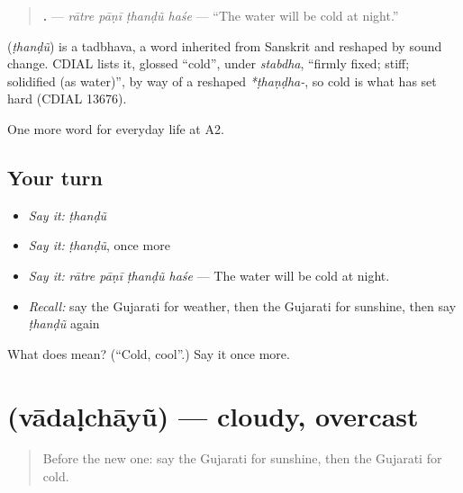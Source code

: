 \begin{quote}
\textbf{   .} — \emph{rātre pāṇī ṭhanḍũ haśe} — \textquotedblleft{}The water will be cold at night.\textquotedblright{}
\end{quote}

\begin{cousinweb}
\textbf{} (\emph{ṭhanḍũ}) is a tadbhava, a word inherited from Sanskrit and reshaped by sound change. CDIAL lists it, glossed \textquotedblleft{}cold\textquotedblright{}, under \emph{stabdha}, \textquotedblleft{}firmly fixed; stiff; solidified (as water)\textquotedblright{}, by way of a reshaped \emph{*ṭhaṇḍha-}, so cold is what has set hard (CDIAL 13676).
\end{cousinweb}

\begin{grammarlens}[title={What you've built}]
One more word for everyday life at A2.
\end{grammarlens}

\subsection*{Your turn}
\begin{itemize}
\raggedright
  \item \emph{Say it:} \emph{ṭhanḍũ}
  \item \emph{Say it:} \emph{ṭhanḍũ}, once more
  \item \emph{Say it:} \emph{rātre pāṇī ṭhanḍũ haśe} — The water will be cold at night.
  \item \emph{Recall:} say the Gujarati for weather, then the Gujarati for sunshine, then say \emph{ṭhanḍũ} again
\end{itemize}

\begin{tcolorbox}[breakable,colback=teal!4,colframe=teal!35!black,title={Before you move on}]
What does  mean? (\textquotedblleft{}Cold, cool\textquotedblright{}.) Say it once more.
\end{tcolorbox}
\section[\texorpdfstring{\gu{વાદળછાયું} (vādaḷchāyũ)}{વાદળછાયું (vādaḷchāyũ)}]{ (vādaḷchāyũ) — cloudy, overcast}

\label{lesson:GU-C213-vadalchayu}



\begin{quote}
Before the new one: say the Gujarati for sunshine, then the Gujarati for cold.
\end{quote}


